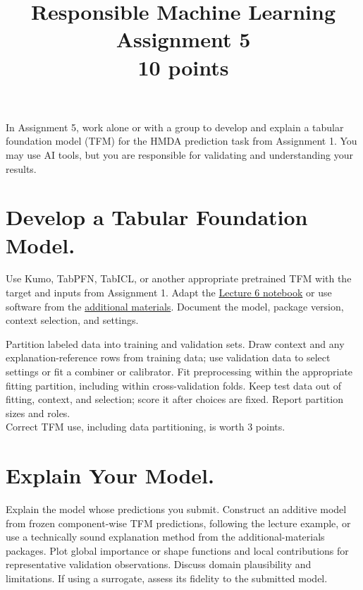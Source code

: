 \documentclass[fleqn]{article}
\title{Responsible Machine Learning\\\Large{Assignment 5}\\\Large{10 points}}
\begin{document}
\maketitle

\noindent In Assignment 5, work alone or with a group to develop and explain a tabular foundation model (TFM) for the HMDA prediction task from Assignment 1. You may use AI tools, but you are responsible for validating and understanding your results.

\setlength{\parskip}{3pt}

\section{Develop a Tabular Foundation Model.}

Use Kumo, TabPFN, TabICL, or another appropriate pretrained TFM with the target and inputs from Assignment 1. Adapt the \href{https://github.com/jphall663/GWU_rml/blob/master/lecture_6.ipynb}{Lecture 6 notebook} or use software from the \href{https://github.com/jphall663/GWU_rml/blob/master/additional_material/am6.md}{additional materials}. Document the model, package version, context selection, and settings.

Partition labeled data into training and validation sets. Draw context and any explanation-reference rows from training data; use validation data to select settings or fit a combiner or calibrator. Fit preprocessing within the appropriate fitting partition, including within cross-validation folds. Keep test data out of fitting, context, and selection; score it after choices are fixed. Report partition sizes and roles.\\

\noindent Correct TFM use, including data partitioning, is worth 3 points.

\section{Explain Your Model.}

Explain the model whose predictions you submit. Construct an additive model from frozen component-wise TFM predictions, following the lecture example, or use a technically sound explanation method from the additional-materials packages. Plot global importance or shape functions and local contributions for representative validation observations. Discuss domain plausibility and limitations. If using a surrogate, assess its fidelity to the submitted model.\\
\end{document}
